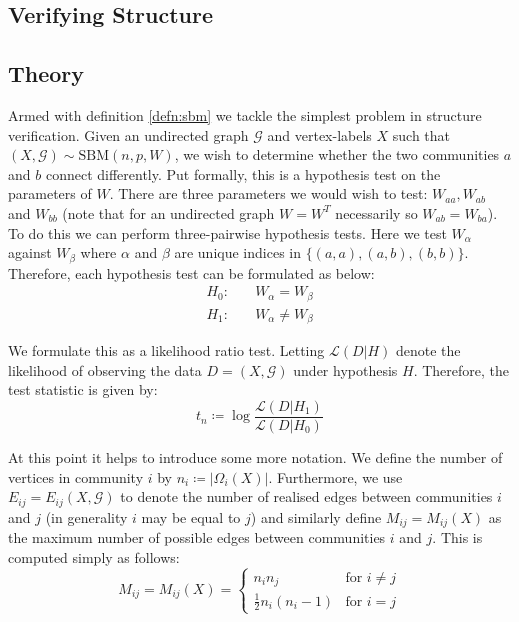 \documentclass[11pt]{article}
\newcommand{\Gcal}{\mathcal{G}}
\newcommand{\lik}{\mathcal{L}}
\begin{document}
\begin{multicols*}{2}
\section{Verifying Structure}
\subsection{Theory}

Armed with definition \ref{defn:sbm} we tackle the simplest problem in structure verification. Given an undirected graph $\Gcal$ and vertex-labels $X$ such that $(X, \Gcal) \sim \textrm{SBM}(n, p, W)$, we wish to determine whether the two communities $a$ and $b$ connect differently. Put formally, this is a hypothesis test on the parameters of $W$. There are three parameters we would wish to test: $W_{aa}, W_{ab}$ and $W_{bb}$ (note that for an undirected graph $W = W^T$ necessarily so $W_{ab} = W_{ba}$). To do this we can perform three-pairwise hypothesis tests. Here we test $W_{\alpha}$ against $W_{\beta}$ where $\alpha$ and $\beta$ are unique indices in $\{(a,a), (a, b), (b,b)\}$. Therefore, each hypothesis test can be formulated as below:
%
\begin{equation}
\begin{aligned}
	H_0:& \quad W_{\alpha} = W_{\beta} \\
	H_1:& \quad W_{\alpha} \neq W_{\beta}
\end{aligned}
\end{equation}

We formulate this as a likelihood ratio test. Letting $\lik(D | H)$ denote the likelihood of observing the data $D = (X, \Gcal)$ under hypothesis $H$. Therefore, the test statistic is given by:
%
\begin{equation}
	t_n \coloneqq \log \frac{\lik(D | H_1)}{\lik(D | H_0)}
	\label{eqn:test-statistic-start}
\end{equation}

At this point it helps to introduce some more notation. We define the number of vertices in community $i$ by $n_i \coloneqq |\Omega_i(X)|$. Furthermore, we use $E_{ij} = E_{ij}(X, \Gcal)$ to denote the number of realised edges between communities $i$ and $j$ (in generality $i$ may be equal to $j$) and similarly define $M_{ij} = M_{ij}(X)$ as the maximum number of possible edges between communities $i$ and $j$. This is computed simply as follows:
%
\begin{equation}
	M_{ij} = M_{ij} (X) = \begin{cases}
		n_i n_j &\text{for } i \neq j \\
		\frac{1}{2}n_i (n_i - 1) &\text{for } i = j
	\end{cases}
\end{equation}


\end{multicols*}
\end{document}
